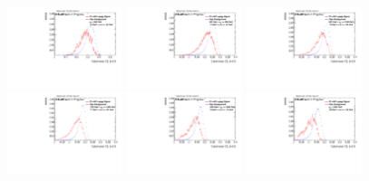 \begin{figure}[H]
\includegraphics[width=0.3\textwidth]{sascha_input/Appendix/Distributions/w/distributions/beta05/h_recoJet_C2_05_bin1.pdf} \hspace{1mm}
\includegraphics[width=0.3\textwidth]{sascha_input/Appendix/Distributions/w/distributions/beta05/h_recoJet_C2_05_bin2.pdf} \hspace{1mm}
\includegraphics[width=0.3\textwidth]{sascha_input/Appendix/Distributions/w/distributions/beta05/h_recoJet_C2_05_bin3.pdf} 
\bigskip
\includegraphics[width=0.3\textwidth]{sascha_input/Appendix/Distributions/w/distributions/beta05/h_recoJet_C2_05_bin4.pdf} \hspace{1mm}
\includegraphics[width=0.3\textwidth]{sascha_input/Appendix/Distributions/w/distributions/beta05/h_recoJet_C2_05_bin5.pdf} \hspace{1mm}
\includegraphics[width=0.3\textwidth]{sascha_input/Appendix/Distributions/w/distributions/beta05/h_recoJet_C2_05_bin6.pdf}

\end{figure}
